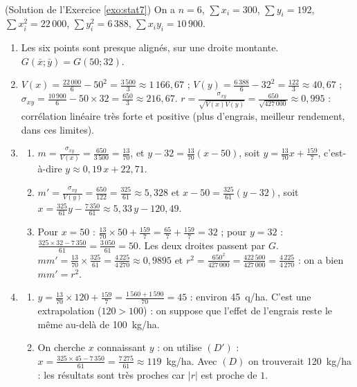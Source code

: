 \begin{corrige}
\begin{sol} ~ \\
(Solution de l'Exercice \ref{exo:stat7})
On a $n = 6$, $\sum x_i = 300$, $\sum y_i = 192$, $\sum x_i^2 = 22\,000$, $\sum y_i^2 = 6\,388$, $\sum x_i y_i = 10\,900$.
\begin{enumerate}
\item Les six points sont presque align\'es, sur une droite montante. $G(\bar{x} ; \bar{y}) = G(50 ; 32)$.
\item $V(x) = \frac{22\,000}{6} - 50^2 = \frac{3\,500}{3} \approx 1\,166,67$ ; 
      $V(y) = \frac{6\,388}{6} - 32^2 = \frac{122}{3} \approx 40,67$ ;
      $\sigma_{xy} = \frac{10\,900}{6} - 50 \times 32 = \frac{650}{3} \approx 216,67$.
      $r = \frac{\sigma_{xy}}{\sqrt{V(x)V(y)}} = \frac{650}{\sqrt{427\,000}} \approx 0,995$ :
      corr\'elation lin\'eaire tr\`es forte et positive (plus d'engrais, meilleur rendement, dans ces limites).
\item \begin{enumerate}
      \item $m = \frac{\sigma_{xy}}{V(x)} = \frac{650}{3\,500} = \frac{13}{70}$, et $y - 32 = \frac{13}{70}(x - 50)$,
            soit $\boxed{y = \frac{13}{70} x + \frac{159}{7}}$, c'est-\`a-dire $y \approx 0,19\,x + 22,71$.
      \item $m' = \frac{\sigma_{xy}}{V(y)} = \frac{650}{122} = \frac{325}{61} \approx 5,328$ et $x - 50 = \frac{325}{61}(y - 32)$,
            soit $x = \frac{325}{61} y - \frac{7\,350}{61} \approx 5,33\,y - 120,49$.
      \item Pour $x = 50$ : $\frac{13}{70}\times 50 + \frac{159}{7} = \frac{65}{7} + \frac{159}{7} = 32$ ; 
            pour $y = 32$ : $\frac{325 \times 32 - 7\,350}{61} = \frac{3\,050}{61} = 50$. Les deux droites passent par $G$.
            $m m' = \frac{13}{70}\times\frac{325}{61} = \frac{4\,225}{4\,270} \approx 0,9895$ et 
            $r^2 = \frac{650^2}{427\,000} = \frac{422\,500}{427\,000} = \frac{4\,225}{4\,270}$ : on a bien $m m' = r^2$.
      \end{enumerate}
\item \begin{enumerate}
      \item $y = \frac{13}{70}\times 120 + \frac{159}{7} = \frac{1\,560 + 1\,590}{70} = 45$ : environ 45~q/ha.
            C'est une extrapolation ($120 > 100$) : on suppose que l'effet de l'engrais reste le m\^eme au-del\`a de 100~kg/ha.
      \item On cherche $x$ connaissant $y$ : on utilise $(D')$ : $x = \frac{325 \times 45 - 7\,350}{61} = \frac{7\,275}{61} \approx 119$~kg/ha.
            Avec $(D)$ on trouverait 120~kg/ha : les r\'esultats sont tr\`es proches car $|r|$ est proche de $1$.
      \end{enumerate}
\end{enumerate}
\end{sol}


\end{corrige}

